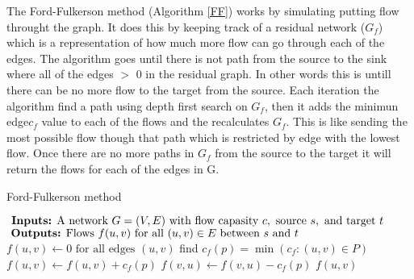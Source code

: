 \documentclass{sig-alternate-05-2015}
\begin{document}
The Ford-Fulkerson method (Algorithm \ref{FF}) works by simulating putting flow throught the graph.  It does this by keeping track of a residual network ($G_{f}$) which is a representation of how much more flow can go through each of the edges.  The algorithm goes until there is not path from the source to the sink where all of the edges $>$ 0 in the residual graph.  In other words this is untill there can be no more flow to the target from the source.  Each iteration the algorithm find a path using depth first search on $G_{f}$, then it adds the minimun edge$ c_{f}$ value to each of the flows and the recalculates $G_{f}$.  This is like sending the most possible flow though that path which is restricted by edge with the lowest flow.  Once there are no more paths in $G_{f}$ from the source to the target it will return the flows for each of the edges in G.


\begin{algorithm}[h!]
\caption{Ford-Fulkerson method}
\label{FF}
\begin{algorithmic}
\STATE $\text{ \textbf{Inputs:} A network } G = (V, E) \text{ with flow capasity } c, \text{ source } s, \text{ and target } t$ 
\STATE $ \text{ \textbf{Outputs:} Flows } f(u, v) \text{ for all }(u, v) \in E \text{ between }s \text{ and }t$
\STATE $f(u, v) \leftarrow 0 \text{ for all edges } (u, v)$
\STATE find $c_{f}(p) = \min (c_{f}:(u, v) \in P)$
\STATE  $f(u, v) \leftarrow f(u,v) + c_{f}(p)$
\STATE  $f(v, u) \leftarrow f(v,u) - c_{f}(p)$
\ENDFOR
\ENDWHILE
\RETURN $f(u,v)$
\end{algorithmic}
\end{algorithm}
\end{document}
